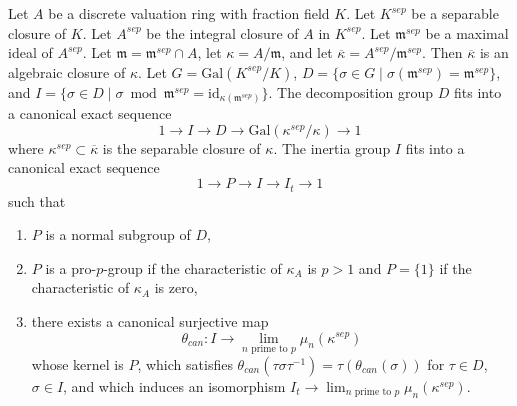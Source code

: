 \begin{lemma}
\label{lemma-structure-decomposition-separable-closure}
Let $A$ be a discrete valuation ring with fraction field $K$.
Let $K^{sep}$ be a separable closure of $K$.
Let $A^{sep}$ be the integral closure of $A$ in $K^{sep}$.
Let $\mathfrak m^{sep}$ be a maximal ideal of $A^{sep}$.
Let $\mathfrak m = \mathfrak m^{sep} \cap A$, let
$\kappa = A/\mathfrak m$, and let
$\overline{\kappa} = A^{sep}/\mathfrak m^{sep}$.
Then $\overline{\kappa}$ is an algebraic closure of $\kappa$.
Let $G = \text{Gal}(K^{sep}/K)$,
$D = \{\sigma \in G \mid \sigma(\mathfrak m^{sep}) = \mathfrak m^{sep}\}$, and
$I = \{\sigma \in D \mid \sigma \bmod \mathfrak m^{sep} =
\text{id}_{\kappa(\mathfrak m^{sep})}\}$.
The decomposition group $D$ fits into a canonical exact sequence
$$
1 \to I \to D \to \text{Gal}(\kappa^{sep}/\kappa) \to 1
$$
where $\kappa^{sep} \subset \overline{\kappa}$ is the separable
closure of $\kappa$.
The inertia group $I$ fits into a canonical exact sequence
$$
1 \to P \to I \to I_t \to 1
$$
such that
\begin{enumerate}
\item $P$ is a normal subgroup of $D$,
\item $P$ is a pro-$p$-group if the characteristic of
$\kappa_A$ is $p > 1$ and $P = \{1\}$ if the characteristic of $\kappa_A$
is zero,
\item there exists a canonical surjective map
$$
\theta_{can} : I \to \lim_{n\text{ prime to }p} \mu_n(\kappa^{sep})
$$
whose kernel is $P$, which satisfies
$\theta_{can}(\tau \sigma \tau^{-1}) = \tau(\theta_{can}(\sigma))$
for $\tau \in D$, $\sigma \in I$, and which induces an isomorphism
$I_t \to \lim_{n\text{ prime to }p} \mu_n(\kappa^{sep})$.
\end{enumerate}
\end{lemma}

